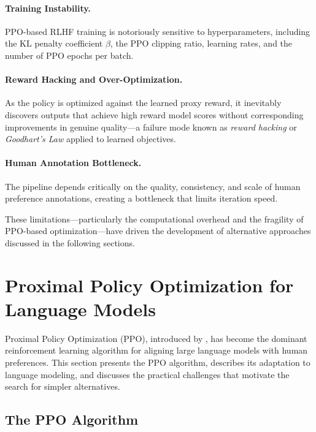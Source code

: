\documentclass[12pt,a4paper]{report}
\begin{document}
\paragraph{Training Instability.}
PPO-based RLHF training is notoriously sensitive to hyperparameters, including the KL penalty coefficient $\beta$, the PPO clipping ratio, learning rates, and the number of PPO epochs per batch.

\paragraph{Reward Hacking and Over-Optimization.}
As the policy is optimized against the learned proxy reward, it inevitably discovers outputs that achieve high reward model scores without corresponding improvements in genuine quality---a failure mode known as \emph{reward hacking} or \emph{Goodhart's Law} applied to learned objectives.

\paragraph{Human Annotation Bottleneck.}
The pipeline depends critically on the quality, consistency, and scale of human preference annotations, creating a bottleneck that limits iteration speed.

\vspace{0.5em}
\noindent These limitations---particularly the computational overhead and the fragility of PPO-based optimization---have driven the development of alternative approaches discussed in the following sections.


\section{Proximal Policy Optimization for Language Models}
\label{sec:ppo}

Proximal Policy Optimization (PPO), introduced by \cite{schulman2017ppo}, has become the dominant reinforcement learning algorithm for aligning large language models with human preferences. This section presents the PPO algorithm, describes its adaptation to language modeling, and discusses the practical challenges that motivate the search for simpler alternatives.

\subsection{The PPO Algorithm}
\end{document}
